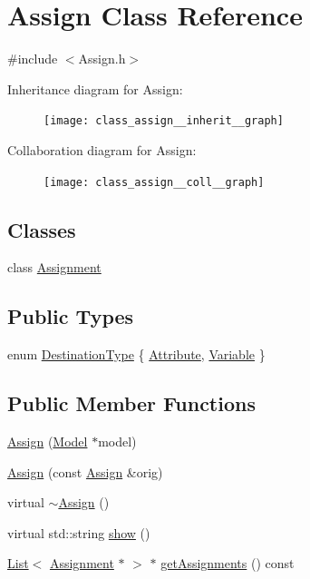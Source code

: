 \hypertarget{class_assign}{\section{Assign Class Reference}
\label{class_assign}
}


{\ttfamily \#include $<$Assign.\-h$>$}



Inheritance diagram for Assign\-:\nopagebreak
\begin{figure}[H]
\begin{center}
\leavevmode
\texttt{[image: class\_assign\_\_inherit\_\_graph]}
\end{center}
\end{figure}


Collaboration diagram for Assign\-:\nopagebreak
\begin{figure}[H]
\begin{center}
\leavevmode
\texttt{[image: class\_assign\_\_coll\_\_graph]}
\end{center}
\end{figure}
\subsection*{Classes}
\begin{DoxyCompactItemize}
\item 
class \hyperlink{class_assign_1_1_assignment}{Assignment}
\end{DoxyCompactItemize}
\subsection*{Public Types}
\begin{DoxyCompactItemize}
\item 
enum \hyperlink{class_assign_ae0f42117c12a8d0bc2bf0b7574070694}{Destination\-Type} \{ \hyperlink{class_assign_ae0f42117c12a8d0bc2bf0b7574070694ada06eaebb0fa138e88ff06aa3ec421a0}{Attribute}, 
\hyperlink{class_assign_ae0f42117c12a8d0bc2bf0b7574070694a4977ebf07df3d5858a48313de98b4692}{Variable}
 \}
\end{DoxyCompactItemize}
\subsection*{Public Member Functions}
\begin{DoxyCompactItemize}
\item 
\hyperlink{class_assign_afaa746a0ce157d4606823ad508dc6281}{Assign} (\hyperlink{class_model}{Model} $\ast$model)
\item 
\hyperlink{class_assign_ae4945adcf1b5dcdd3f57faa9dd85a2b0}{Assign} (const \hyperlink{class_assign}{Assign} \&orig)
\item 
virtual \hyperlink{class_assign_aa005626af06022d9101c5e38e794dc47}{$\sim$\-Assign} ()
\item 
virtual std\-::string \hyperlink{class_assign_af5022b92204adcd9ee3e444b7e316d07}{show} ()
\item 
\hyperlink{class_list}{List}$<$ \hyperlink{class_assign_1_1_assignment}{Assignment} $\ast$ $>$ $\ast$ \hyperlink{class_assign_aca4aaa2185cc8770e56e1b6928c33dc0}{get\-Assignments} () const 
\end{DoxyCompactItemize}
